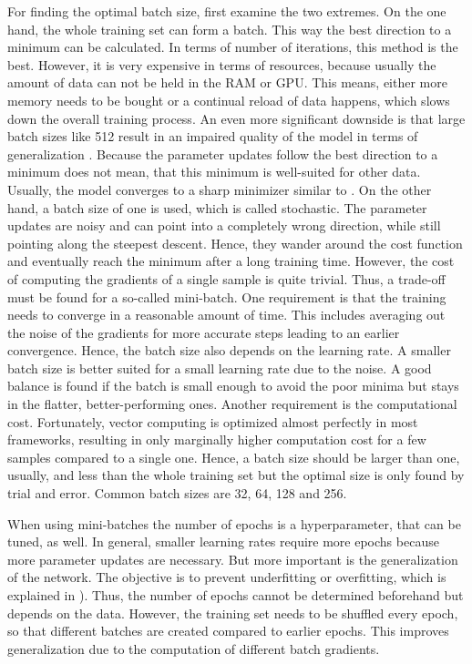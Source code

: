 For finding the optimal batch size, first examine the two extremes.
On the one hand, the whole training set can form a batch.
This way the best direction to a minimum can be calculated.
In terms of number of iterations, this method is the best.
However, it is very expensive in terms of resources, because usually the amount of data can not be held in the RAM or GPU.
This means, either more memory needs to be bought or a continual reload of data happens, which slows down the overall training process.
An even more significant downside is that large batch sizes like 512 result in an impaired quality of the model in terms of generalization \cite{DBLP:journals/corr/KeskarMNST16}.
Because the parameter updates follow the best direction to a minimum does not mean, that this minimum is well-suited for other data.
Usually, the model converges to a sharp minimizer similar to .
On the other hand, a batch size of one is used, which is called stochastic.
The parameter updates are noisy and can point into a completely wrong direction, while still pointing along the steepest descent.
Hence, they wander around the cost function and eventually reach the minimum after a long training time.
However, the cost of computing the gradients of a single sample is quite trivial.
Thus, a trade-off must be found for a so-called mini-batch.
One requirement is that the training needs to converge in a reasonable amount of time.
This includes averaging out the noise of the gradients for more accurate steps leading to an earlier convergence.
Hence, the batch size also depends on the learning rate.
A smaller batch size is better suited for a small learning rate due to the noise.
A good balance is found if the batch is small enough to avoid the poor minima but stays in the flatter, better-performing ones.
Another requirement is the computational cost.
Fortunately, vector computing is optimized almost perfectly in most frameworks, resulting in only marginally higher computation cost for a few samples compared to a single one.
Hence, a batch size should be larger than one, usually, and less than the whole training set but the optimal size is only found by trial and error.
Common batch sizes are 32, 64, 128 and 256.

When using mini-batches the number of epochs is a hyperparameter, that can be tuned, as well.
In general, smaller learning rates require more epochs because more parameter updates are necessary.
But more important is the generalization of the network.
The objective is to prevent underfitting or overfitting, which is explained in ).
Thus, the number of epochs cannot be determined beforehand but depends on the data.
However, the training set needs to be shuffled every epoch, so that different batches are created compared to earlier epochs.
This improves generalization due to the computation of different batch gradients.